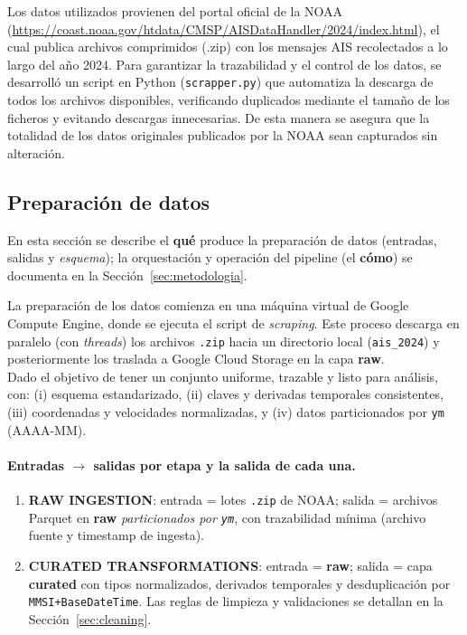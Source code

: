 \documentclass[10pt]{article}
\begin{document}
Los datos utilizados provienen del portal oficial de la NOAA (\url{https://coast.noaa.gov/htdata/CMSP/AISDataHandler/2024/index.html}), el cual publica archivos comprimidos (.zip) con los mensajes AIS recolectados a lo largo del año 2024. 
Para garantizar la trazabilidad y el control de los datos, se desarrolló un script en Python (\texttt{scrapper.py}) que automatiza la descarga de todos los archivos disponibles, verificando duplicados mediante el tamaño de los ficheros y evitando descargas innecesarias. 
De esta manera se asegura que la totalidad de los datos originales publicados por la NOAA sean capturados sin alteración.

\subsection{Preparación de datos} %
En esta sección se describe el \textbf{qué} produce la preparación de datos (entradas, salidas y \emph{esquema}); la orquestación y operación del pipeline (el \textbf{cómo}) se documenta en la Sección~\ref{sec:metodologia}.

La preparación de los datos comienza en una máquina virtual de Google Compute Engine, donde se ejecuta el script de \textit{scraping}. Este proceso descarga en paralelo (con \textit{threads}) los archivos \texttt{.zip} hacia un directorio local (\texttt{ais\_2024}) y posteriormente los traslada a Google Cloud Storage en la capa \textbf{raw}.\\

Dado el objetivo de tener un conjunto uniforme, trazable y listo para análisis, con: (i) esquema estandarizado, (ii) claves y derivadas temporales consistentes, (iii) coordenadas y velocidades normalizadas, y (iv) datos particionados por \texttt{ym} (AAAA-MM).

\paragraph{Entradas $\rightarrow$ salidas por etapa y la salida de cada una.}
\begin{enumerate}
  \item \textbf{RAW INGESTION}: entrada = lotes \texttt{.zip} de NOAA; salida = archivos Parquet en \textbf{raw} \emph{particionados por \texttt{ym}}, con trazabilidad mínima (archivo fuente y timestamp de ingesta).
  \item \textbf{CURATED TRANSFORMATIONS}: entrada = \textbf{raw}; salida = capa \textbf{curated} con tipos normalizados, derivados temporales y desduplicación por \texttt{MMSI+BaseDateTime}. Las reglas de limpieza y validaciones se detallan en la Sección~\ref{sec:cleaning}.
\end{enumerate}
\end{document}
